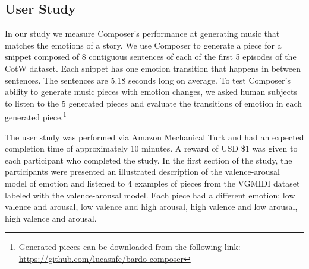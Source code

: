 \subsection{User Study}

In our study we measure Composer's performance at generating music
that matches the emotions of a story. We use Composer to generate
a piece for a snippet composed of 8 contiguous sentences of each of the first 5 episodes of the CotW dataset.
Each snippet has one emotion transition that happens in between sentences. The sentences are 5.18 seconds long on average.
To test Composer's ability to generate
music pieces with emotion changes, we asked human subjects to listen
to the 5 generated pieces and evaluate the transitions of emotion in
each generated piece.\footnote{Generated pieces can be downloaded from the following link: \url{https://github.com/lucasnfe/bardo-composer}}

The user study was performed via Amazon Mechanical Turk and had an expected completion time of approximately 10 minutes. A reward
of USD \$1 was given to each participant who completed the
study.
In the
first section of the study, the participants were presented an illustrated description
of the valence-arousal model of emotion and listened to 4 examples of pieces
from the VGMIDI dataset labeled with the valence-arousal model. Each piece had a different emotion: low valence and arousal, low valence and high arousal, high valence and low arousal, high valence and arousal.


